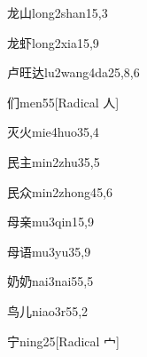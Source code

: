 \begin{verbete}{龙山}{long2shan1}{5,3}
\end{verbete}

\begin{verbete}{龙虾}{long2xia1}{5,9}
\end{verbete}

\begin{verbete}{卢旺达}{lu2wang4da2}{5,8,6}
\end{verbete}

\begin{verbete}{们}{men5}{5}[Radical 人]
\end{verbete}

\begin{verbete}{灭火}{mie4huo3}{5,4}
\end{verbete}

\begin{verbete}{民主}{min2zhu3}{5,5}
\end{verbete}

\begin{verbete}{民众}{min2zhong4}{5,6}
\end{verbete}

\begin{verbete}{母亲}{mu3qin1}{5,9}
\end{verbete}

\begin{verbete}{母语}{mu3yu3}{5,9}
\end{verbete}

\begin{verbete}{奶奶}{nai3nai5}{5,5}
\end{verbete}

\begin{verbete}{鸟儿}{niao3r5}{5,2}
\end{verbete}

\begin{verbete}{宁}{ning2}{5}[Radical 宀]
\end{verbete}

